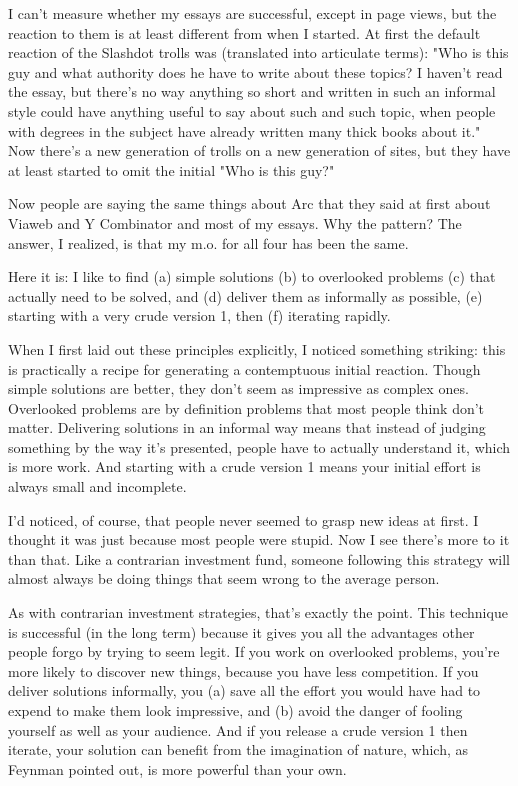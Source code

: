 I can't measure whether my essays are successful, except in page
views, but the reaction to them is at least different from when I
started.  At first the default reaction of the Slashdot trolls was
(translated into articulate terms): "Who is this guy and what
authority does he have to write about these topics?  I haven't read
the essay, but there's no way anything so short and written in such
an informal style could have anything useful to say about such and
such topic, when people with degrees in the subject have already
written many thick books about it." Now there's a new generation
of trolls on a new generation of sites, but they have at least
started to omit the initial "Who is this guy?"

Now people are saying the same things about Arc that they said at
first about Viaweb and Y Combinator and most of my essays.  Why the
pattern?  The answer, I realized, is that my m.o. for all four has
been the same.

Here it is: I like to find (a) simple solutions (b) to overlooked
problems (c) that actually need to be solved, and (d) deliver them
as informally as possible, (e) starting with a very crude version
1, then (f) iterating rapidly.

When I first laid out these principles explicitly, I noticed something
striking: this is practically a recipe for generating a contemptuous
initial reaction.  Though simple solutions are better, they don't
seem as impressive as complex ones.  Overlooked problems are by
definition problems that most people think don't matter.  Delivering
solutions in an informal way means that instead of judging something
by the way it's presented, people have to actually understand it,
which is more work.  And starting with a crude version 1 means your
initial effort is always small and incomplete.

I'd noticed, of course, that people never seemed to grasp new ideas
at first.  I thought it was just because most people were stupid.
Now I see there's more to it than that.   Like a
contrarian investment fund, someone following this strategy will
almost always be doing things that seem wrong to the average person.

As with contrarian investment strategies, that's exactly the point.
This technique is successful (in the long term) because it gives you
all the advantages other people forgo by trying to seem legit.  If
you work on overlooked problems, you're more likely to discover new
things, because you have less competition.  If you deliver solutions
informally, you (a) save all the effort you would have had to expend
to make them look impressive, and (b) avoid the danger of fooling
yourself as well as your audience.  And if you release a crude
version 1 then iterate, your solution can benefit from the imagination
of nature, which, as Feynman pointed out, is more powerful than
your own.

